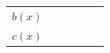 {\begin{tabular}[t]{|l|l|l|l|l|l|}
     \tabularnewline\cline{1-1}\cline{2-2}\cline{3-3}\cline{4-4}\cline{5-5}\cline{6-6}
                  $b\left(x\right)$
                 &
         &
         &
         &
         &
     \tabularnewline\cline{1-1}\cline{2-2}\cline{3-3}\cline{4-4}\cline{5-5}\cline{6-6}
                  $c\left(x\right)$
                 &
         &
         &
         &
         &

\end{tabular}}
